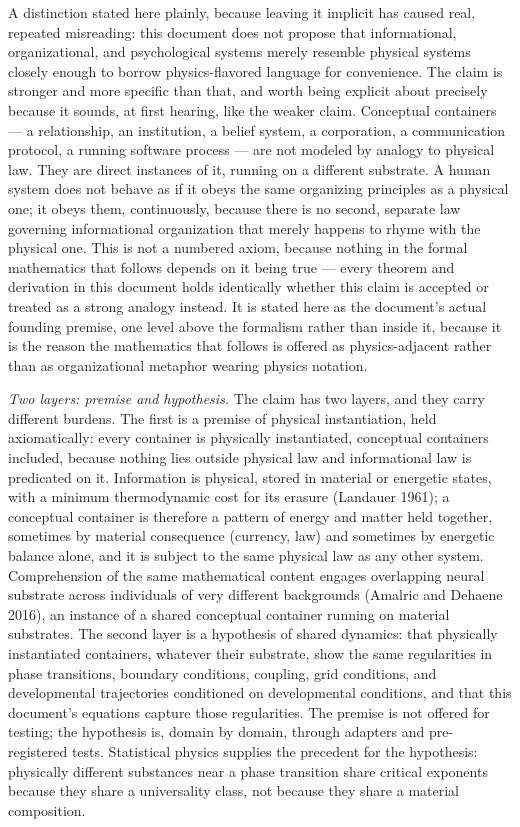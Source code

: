 \documentclass[
]{article}
\begin{document}
A distinction stated here plainly, because leaving it implicit has
caused real, repeated misreading: this document does not propose that
informational, organizational, and psychological systems merely resemble
physical systems closely enough to borrow physics-flavored language for
convenience. The claim is stronger and more specific than that, and
worth being explicit about precisely because it sounds, at first
hearing, like the weaker claim. Conceptual containers --- a
relationship, an institution, a belief system, a corporation, a
communication protocol, a running software process --- are not modeled
by analogy to physical law. They are direct instances of it, running on
a different substrate. A human system does not behave as if it obeys the
same organizing principles as a physical one; it obeys them,
continuously, because there is no second, separate law governing
informational organization that merely happens to rhyme with the
physical one. This is not a numbered axiom, because nothing in the
formal mathematics that follows depends on it being true --- every
theorem and derivation in this document holds identically whether this
claim is accepted or treated as a strong analogy instead. It is stated
here as the document's actual founding premise, one level above the
formalism rather than inside it, because it is the reason the
mathematics that follows is offered as physics-adjacent rather than as
organizational metaphor wearing physics notation.

\emph{Two layers: premise and hypothesis.} The claim has two layers, and
they carry different burdens. The first is a premise of physical
instantiation, held axiomatically: every container is physically
instantiated, conceptual containers included, because nothing lies
outside physical law and informational law is predicated on it.
Information is physical, stored in material or energetic states, with a
minimum thermodynamic cost for its erasure (Landauer 1961); a conceptual
container is therefore a pattern of energy and matter held together,
sometimes by material consequence (currency, law) and sometimes by
energetic balance alone, and it is subject to the same physical law as
any other system. Comprehension of the same mathematical content engages
overlapping neural substrate across individuals of very different
backgrounds (Amalric and Dehaene 2016), an instance of a shared
conceptual container running on material substrates. The second layer is
a hypothesis of shared dynamics: that physically instantiated
containers, whatever their substrate, show the same regularities in
phase transitions, boundary conditions, coupling, grid conditions, and
developmental trajectories conditioned on developmental conditions, and
that this document's equations capture those regularities. The premise
is not offered for testing; the hypothesis is, domain by domain, through
adapters and pre-registered tests. Statistical physics supplies the
precedent for the hypothesis: physically different substances near a
phase transition share critical exponents because they share a
universality class, not because they share a material composition.
\end{document}
